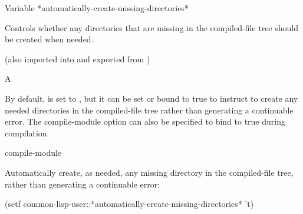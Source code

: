 \documentclass[10pt,twoside,english,pdftex]{article}
\begin{document}
\begin{functiondoc}{Variable}%
  {*automatically-create-missing-directories*}{}%
%
%
%

\fnsyntax

\fnpurpose Controls whether any directories that are missing
in the compiled-file tree should be created when needed.

\fnpackage {} 
(also imported into and exported from )

\fnmodule {}

\fnvaluetype A 

\fninitialvalue \nil

\fndescription By default,
 is set to \nil, but
it can be set or bound to true to instruct
 to create any needed directories in
the compiled-file tree rather than generating a continuable error. The
compile-module option  can also be specified to bind
 to true during
 compilation.

\begin{alsos}{compile-module}
\end{alsos}

\fnexample 
Automatically create, as needed, any missing directory in the compiled-file
tree, rather than generating a continuable error:
%
\W\supp
\begin{example}
  (setf common-lisp-user::*automatically-create-missing-directories* 't)
\end{example}

\end{functiondoc}

\end{document}
